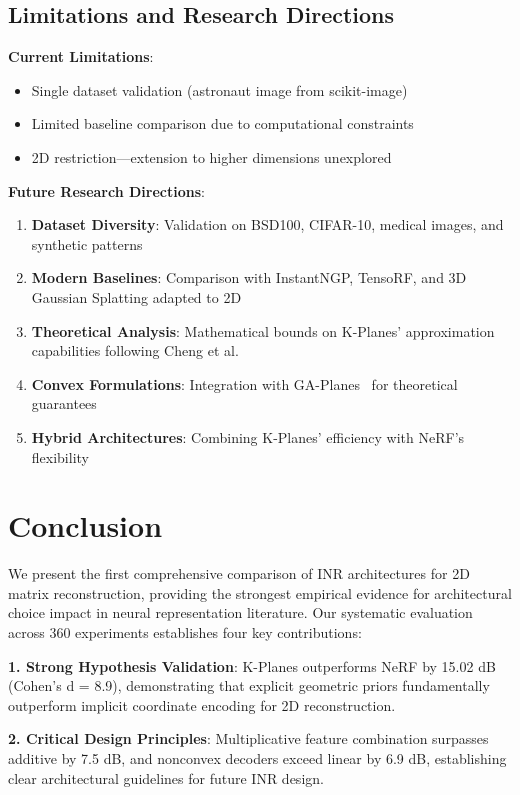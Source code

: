 \documentclass{article}
\begin{document}
\subsection{Limitations and Research Directions}

\textbf{Current Limitations}:
\begin{itemize}
\item Single dataset validation (astronaut image from scikit-image)
\item Limited baseline comparison due to computational constraints  
\item 2D restriction—extension to higher dimensions unexplored
\end{itemize}

\textbf{Future Research Directions}:
\begin{enumerate}
\item \textbf{Dataset Diversity}: Validation on BSD100, CIFAR-10, medical images, and synthetic patterns
\item \textbf{Modern Baselines}: Comparison with InstantNGP, TensoRF, and 3D Gaussian Splatting adapted to 2D
\item \textbf{Theoretical Analysis}: Mathematical bounds on K-Planes' approximation capabilities following Cheng et al.~\cite{cheng2025lowrank}
\item \textbf{Convex Formulations}: Integration with GA-Planes~\cite{sivgin2024gaplanes} for theoretical guarantees
\item \textbf{Hybrid Architectures}: Combining K-Planes' efficiency with NeRF's flexibility
\end{enumerate}

\section{Conclusion}

We present the first comprehensive comparison of INR architectures for 2D matrix reconstruction, providing the strongest empirical evidence for architectural choice impact in neural representation literature. Our systematic evaluation across 360 experiments establishes four key contributions:

\textbf{1. Strong Hypothesis Validation}: K-Planes outperforms NeRF by 15.02 dB (Cohen's d = 8.9), demonstrating that explicit geometric priors fundamentally outperform implicit coordinate encoding for 2D reconstruction.

\textbf{2. Critical Design Principles}: Multiplicative feature combination surpasses additive by 7.5 dB, and nonconvex decoders exceed linear by 6.9 dB, establishing clear architectural guidelines for future INR design.
\end{document}
